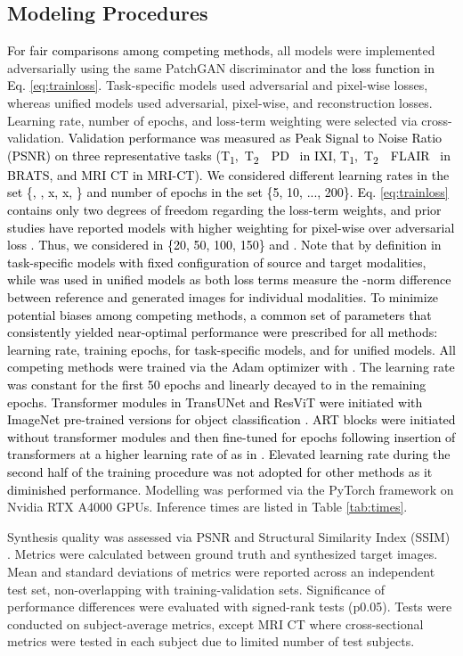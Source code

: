 \documentclass[journal,twoside,web]{ieeecolor}
\newcommand{\ToneTtwoPD}{T\textsubscript{1},~T\textsubscript{2}~~PD}
\newcommand{\ToneTtwoFlair}{T\textsubscript{1},~T\textsubscript{2}~~FLAIR}
\newcommand*{\revhl}{\textcolor{black}}
\begin{document}
\vspace{-1.25ex}
\subsection{Modeling Procedures}
\revhl{For fair comparisons among competing methods,} all models were implemented adversarially using the same PatchGAN discriminator \revhl{and the loss function in Eq. \ref{eq:trainloss}.} Task-specific models used adversarial and pixel-wise losses, whereas unified models used adversarial, pixel-wise, and reconstruction losses. Learning rate, number of epochs, and loss-term weighting were selected via cross-validation. \revhl{Validation performance was measured as Peak Signal to Noise Ratio (PSNR) on three representative tasks (\ToneTtwoPD~ in IXI, \ToneTtwoFlair~ in BRATS, and MRI  CT in MRI-CT). We considered different learning rates in the set \{, , x, x, \} and number of epochs in the set \{5, 10, ..., 200\}. Eq. \ref{eq:trainloss} contains only two degrees of freedom regarding the loss-term weights, and prior studies have reported models with higher weighting for pixel-wise over adversarial loss \cite{pgan,yu2019}. Thus, we considered  in \{20, 50, 100, 150\} and . Note that  by definition in task-specific models with fixed configuration of source and target modalities, while  was used in unified models as both loss terms measure the -norm difference between reference and generated images for individual modalities. To minimize potential biases among competing methods, a common set of parameters that consistently yielded near-optimal performance were prescribed for all methods:  learning rate,  training epochs,  for task-specific models, and  for unified models. All competing methods were trained via the Adam optimizer \cite{adam} with . The learning rate was constant for the first 50 epochs and linearly decayed to  in the remaining epochs. Transformer modules in TransUNet and ResViT were initiated with ImageNet pre-trained versions for object classification \cite{imagenet21k}. ART blocks were initiated without transformer modules and then fine-tuned for  epochs following insertion of transformers at a higher learning rate of  as in \cite{vit}. Elevated learning rate during the second half of the training procedure was not adopted for other methods as it diminished performance.} Modelling was performed via the PyTorch framework on Nvidia RTX A4000 GPUs. Inference times are listed in Table \ref{tab:times}.

Synthesis quality was assessed via PSNR and Structural Similarity Index (SSIM) \cite{ssim}. Metrics were calculated between ground truth and synthesized target images. Mean and standard deviations of metrics were reported across an independent test set, non-overlapping with training-validation sets. Significance of performance differences were evaluated with signed-rank tests (p0.05). Tests were conducted on subject-average metrics, except MRI  CT where cross-sectional metrics were tested in each subject due to limited number of test subjects.  
\end{document}
